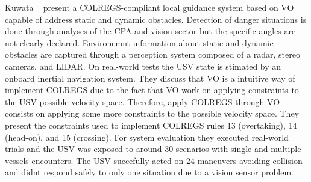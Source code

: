 Kuwata \etal~\cite{Kuwata2014Safe} present a COLREGS-compliant local guidance system based on \ac{VO} capable of address static and dynamic obstacles.
Detection of danger situations is done through analyses of the \ac{CPA} and vision sector but the specific angles are not clearly declared.
Environemnt information about static and dynamic obstacles are captured through a perception system composed of a radar, stereo cameras, and \ac{LIDAR}.
On real-world tests the \ac{USV} state is stimated by an onboard inertial navigation system.
They discuss that \ac{VO} is a intuitive way of implement COLREGS due to the fact that \ac{VO} work on applying constraints to the \ac{USV} possible velocity space.
Therefore, apply COLREGS through \ac{VO} consists on applying some more constraints to the possible velocity space.
They present the constraints used to implement COLREGS rules 13 (overtaking), 14 (head-on), and 15 (crossing).
For system evaluation they executed real-world trials and the \ac{USV} was exposed to around 30 scenarios with single and multiple vessels encounters. 
The \ac{USV} succefully acted on 24 maneuvers avoiding collision and didnt respond safely to only one situation due to a vision sensor problem.
